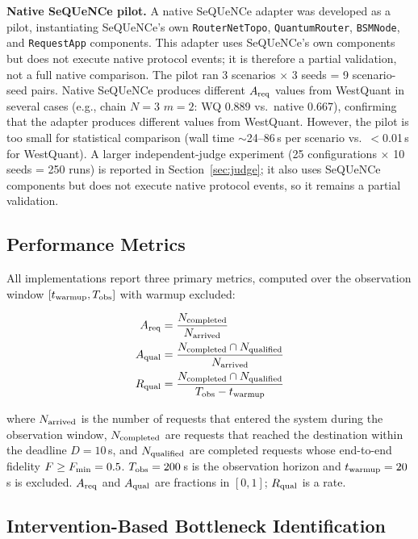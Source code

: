 \documentclass[aps,prapplied,reprint,superscriptaddress]{revtex4-2}
\newcommand{\Areq}{A_{\rm req}}
\newcommand{\Aqual}{A_{\rm qual}}
\begin{document}
\textbf{Native SeQUeNCe pilot.} A native SeQUeNCe adapter was developed as a pilot, instantiating SeQUeNCe's own \texttt{RouterNetTopo}, \texttt{QuantumRouter}, \texttt{BSMNode}, and \texttt{RequestApp} components. This adapter uses SeQUeNCe's own components but does not execute native protocol events; it is therefore a partial validation, not a full native comparison. The pilot ran 3 scenarios $\times$ 3 seeds = 9 scenario-seed pairs. Native SeQUeNCe produces different $\Areq$ values from WestQuant in several cases (e.g., chain $N{=}3$ $m{=}2$: WQ 0.889 vs.\ native 0.667), confirming that the adapter produces different values from WestQuant. However, the pilot is too small for statistical comparison (wall time $\sim$24--86\,s per scenario vs.\ $<$0.01\,s for WestQuant). A larger independent-judge experiment (25 configurations $\times$ 10 seeds = 250 runs) is reported in Section~\ref{sec:judge}; it also uses SeQUeNCe components but does not execute native protocol events, so it remains a partial validation.

\subsection{Performance Metrics}

All implementations report three primary metrics, computed over the observation window $[t_{\rm warmup}, T_{\rm obs}]$ with warmup excluded:

\begin{align}
\Areq &= \frac{N_{\rm completed}}{N_{\rm arrived}} \\
\Aqual &= \frac{N_{\rm completed} \cap N_{\rm qualified}}{N_{\rm arrived}} \\
R_{\rm qual} &= \frac{N_{\rm completed} \cap N_{\rm qualified}}{T_{\rm obs} - t_{\rm warmup}}
\end{align}

where $N_{\rm arrived}$ is the number of requests that entered the system during the observation window, $N_{\rm completed}$ are requests that reached the destination within the deadline $D = 10$\,s, and $N_{\rm qualified}$ are completed requests whose end-to-end fidelity $F \geq F_{\rm min} = 0.5$. $T_{\rm obs} = 200$\,s is the observation horizon and $t_{\rm warmup} = 20$\,s is excluded. $\Areq$ and $\Aqual$ are fractions in $[0, 1]$; $R_{\rm qual}$ is a rate.

\subsection{Intervention-Based Bottleneck Identification}
\end{document}
